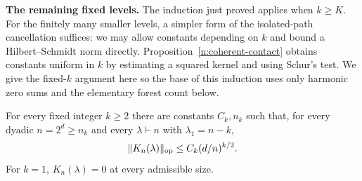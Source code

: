 \medskip\noindent\textbf{The remaining fixed levels.}\enspace
The induction just proved applies when $k\ge K$. For the finitely many
smaller levels, a simpler form of the isolated-path cancellation suffices:
we may allow constants depending on $k$ and bound a Hilbert--Schmidt
norm directly. Proposition~\ref{n:coherent-contact} obtains constants
uniform in $k$ by estimating a squared kernel and using Schur's test.
We give the fixed-$k$ argument here so the base of this induction uses
only harmonic zero sums and the elementary forest count below.
\begin{lemma}\label{cas:fixed-level}
For every fixed integer $k\ge2$ there are constants $C_k,n_k$ such that,
for every dyadic $n=2^d\ge n_k$ and every $\lambda\vdash n$ with
$\lambda_1=n-k$,
\[
 \|K_n(\lambda)\|_{\mathrm{op}}\le C_k(d/n)^{k/2}.
\]
For $k=1$, $K_n(\lambda)=0$ at every admissible size.
\end{lemma}
